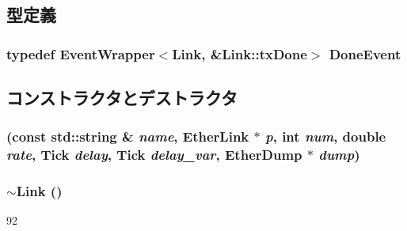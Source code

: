 \subsection{型定義}
\hypertarget{classEtherLink_1_1Link_ad78ef1129ed0f85428598d01a78019f3}{
\subsubsection[{DoneEvent}]{\setlength{\rightskip}{0pt plus 5cm}typedef {\bf EventWrapper}$<${\bf Link}, \&Link::txDone$>$ {\bf DoneEvent}}}
\label{classEtherLink_1_1Link_ad78ef1129ed0f85428598d01a78019f3}


\subsection{コンストラクタとデストラクタ}
\hypertarget{classEtherLink_1_1Link_a008072dca8221a9e8633f7a692bf8529}{
\subsubsection[{Link}]{ (const std::string \& {\em name}, \/  {\bf EtherLink} $\ast$ {\em p}, \/  int {\em num}, \/  double {\em rate}, \/  {\bf Tick} {\em delay}, \/  {\bf Tick} {\em delay\_\-var}, \/  {\bf EtherDump} $\ast$ {\em dump})}}
\label{classEtherLink_1_1Link_a008072dca8221a9e8633f7a692bf8529}
\hypertarget{classEtherLink_1_1Link_a2b6c85429ae38a687fbffb017cc773b9}{
\subsubsection[{$\sim$Link}]{\setlength{\rightskip}{0pt plus 5cm}$\sim${\bf Link} ()}}
\label{classEtherLink_1_1Link_a2b6c85429ae38a687fbffb017cc773b9}



\begin{DoxyCode}
92 {}
\end{DoxyCode}


